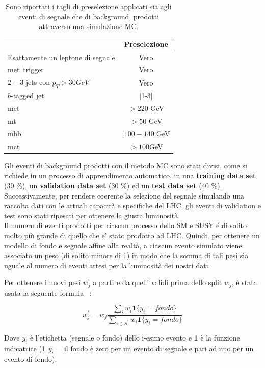 \begin{table}[h!]
	\centering
	\begin{tabular}{lc}
		\hline
		&Preselezione \\
		\hline
		Esattamente un leptone di segnale&Vero\\
		met\ trigger&Vero\\
		$2-3$ jets con $p_{T}>30 GeV$&Vero\\
		$b$-tagged jet&[1-3]\\
		met\ &$> 220$ GeV\\
		mt\ &$> 50$ GeV\\
		mbb\ &[$100-140$]GeV\\
		mct\ &$>100$GeV\\
		\hline
	\end{tabular}
	\caption{Sono riportati i tagli di preselezione applicati sia agli eventi di segnale che di background, prodotti attraverso una simulazione MC.}
	\label{tab:tagli di preselezione}
\end{table} 
Gli eventi di background prodotti con il metodo MC sono stati divisi, come si richiede in un processo di apprendimento automatico, in una \textbf{training data set} (30 \%), un \textbf{validation data set} (30 \%) ed un \textbf{test data set} (40 \%). Successivamente, per rendere coerente la selezione del segnale simulando una raccolta dati con le attuali capacità e specifiche del LHC, gli eventi di validation e test sono stati ripesati per ottenere la giusta luminosità.\\
Il numero di eventi prodotti per ciascun processo dello SM e SUSY é di solito molto più grande di quello che e' stato prodotto ad LHC. Quindi, per ottenere un modello di fondo e segnale affine alla realtà, a ciascun evento simulato viene associato un peso (di solito minore di 1) in modo che la somma di tali pesi sia uguale al numero di eventi attesi per la luminosità dei nostri dati.


Per ottenere i nuovi pesi $w_{j}^{'}$ a partire da quelli validi prima dello split $w_{j}$, è stata usata la seguente formula ~\cite{HiggsChalllenge}:

\begin{equation}
	\label{eq:ripesaggio}
    w_j^{'}=  w_{j}\frac{\sum_{i} w_{i} \textbf{1} \lbrace y_{i}=fondo\rbrace }{\sum_{i\in S^{'}}w_{i} \textbf{1} \lbrace y_{i}=fondo\rbrace }  
\end{equation}

Dove $y_{i}$ è l'etichetta (segnale o fondo) dello i-esimo evento e \textbf{1} è la funzione indicatrice (\textbf{1} {$y_{i}$ = il fondo} è zero per un evento di segnale e pari ad uno per un evento di fondo).


